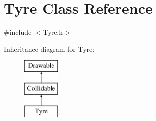 \hypertarget{class_tyre}{}\section{Tyre Class Reference}
\label{class_tyre}


{\ttfamily \#include $<$Tyre.\+h$>$}

Inheritance diagram for Tyre\+:\begin{figure}[H]
\begin{center}
\leavevmode
\includegraphics[height=3.000000cm]{class_tyre}
\end{center}
\end{figure}
